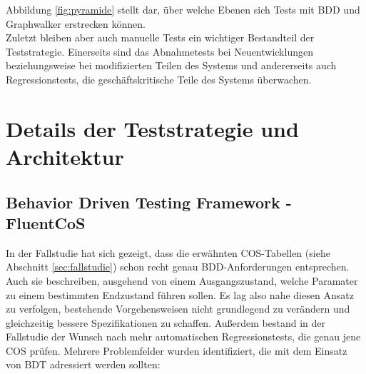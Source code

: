 Abbildung \ref{fig:pyramide} stellt dar, über welche Ebenen sich Tests mit \Gls{BDD} und Graphwalker erstrecken können.\\
Zuletzt bleiben aber auch manuelle Tests ein wichtiger Bestandteil der Teststrategie. Einerseits sind das Abnahmetests bei Neuentwicklungen beziehungsweise bei modifizierten Teilen des Systems und andererseits auch Regressionstests, die geschäftskritische Teile des Systems überwachen.

\section{Details der Teststrategie und Architektur}
\label{sec:details}


\subsection{Behavior Driven Testing Framework - FluentCoS}
\label{sec:fluent_cos}
In der Fallstudie hat sich gezeigt, dass die erwähnten \Gls{COS}-Tabellen (siehe Abschnitt \ref{sec:fallstudie}) schon recht genau \Gls{BDD}-Anforderungen entsprechen. Auch sie beschreiben, ausgehend von einem Ausgangszustand, welche Paramater zu einem bestimmten Endzustand führen sollen. Es lag also nahe diesen Ansatz zu verfolgen, bestehende Vorgehensweisen nicht grundlegend zu verändern und gleichzeitig bessere Spezifikationen zu schaffen. Außerdem bestand in der Fallstudie der Wunsch nach mehr automatischen Regressionstests, die genau jene \Gls{COS} prüfen. Mehrere Problemfelder wurden identifiziert, die mit dem Einsatz von \Gls{BDT} adressiert werden sollten:

